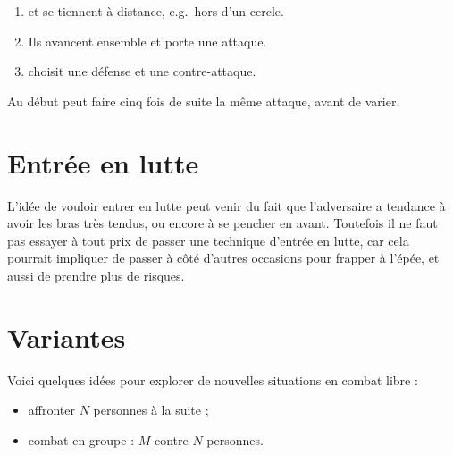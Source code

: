 \begin{exercice}
\begin{enumerate}
	\item \A et \D se tiennent à distance, e.g.\ hors d'un cercle.
	
	\item Ils avancent ensemble et \A porte une attaque.
	
	\item \D choisit une défense et une contre-attaque.
\end{enumerate}

Au début \A peut faire cinq fois de suite la même attaque, avant de varier.

\end{exercice}


\section{Entrée en lutte}


L'idée de vouloir entrer en lutte peut venir du fait que l'adversaire a tendance à avoir les bras très tendus, ou encore à se pencher en avant.
Toutefois il ne faut pas essayer à tout prix de passer une technique d'entrée en lutte, car cela pourrait impliquer de passer à côté d'autres occasions pour frapper à l'épée, et aussi de prendre plus de risques.


\section{Variantes}


Voici quelques idées pour explorer de nouvelles situations en combat libre :
\begin{itemize}
	\item affronter $N$ personnes à la suite ;
	\item combat en groupe : $M$ contre $N$ personnes.
\end{itemize}

